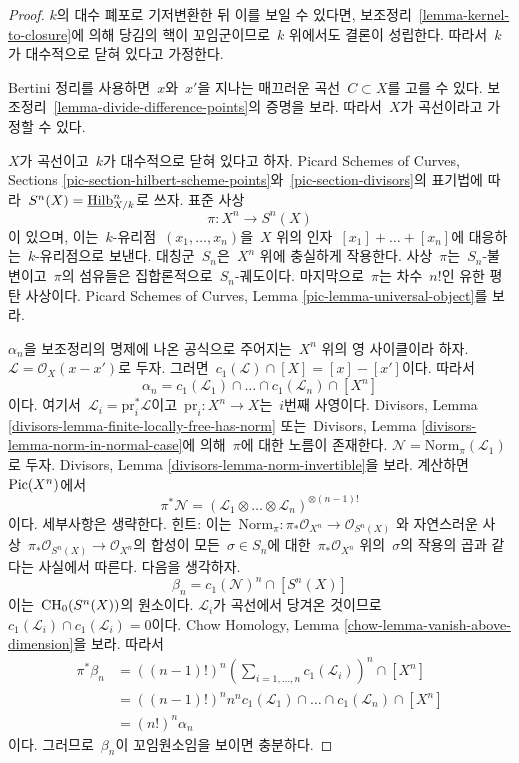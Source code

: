 \begin{proof}
$k$의 대수 폐포로 기저변환한 뒤 이를 보일 수 있다면, 보조정리\ 
\ref{lemma-kernel-to-closure}에 의해 당김의 핵이 꼬임군이므로\ 
$k$ 위에서도 결론이 성립한다. 따라서\  $k$가 대수적으로 닫혀 있다고
가정한다.

\medskip\noindent
Bertini 정리를 사용하면\  $x$와\  $x'$을 지나는 매끄러운 곡선\ 
$C \subset X$를 고를 수 있다. 보조정리\ 
\ref{lemma-divide-difference-points}의 증명을 보라. 따라서\  $X$가
곡선이라고 가정할 수 있다.

\medskip\noindent
$X$가 곡선이고\  $k$가 대수적으로 닫혀 있다고 하자. Picard Schemes of
Curves, Sections \ref{pic-section-hilbert-scheme-points}와\ 
\ref{pic-section-divisors}의 표기법에 따라\ 
$S^n(X) = \underline{\mathrm{Hilb}}^n_{X/k}$로 쓰자. 표준 사상
$$
\pi : X^n \longrightarrow S^n(X)
$$
이 있으며, 이는\  $k$-유리점\  $(x_1, \ldots, x_n)$을\  $X$ 위의 인자\ 
$[x_1] + \ldots + [x_n]$에 대응하는\  $k$-유리점으로 보낸다.
대칭군\  $S_n$은\  $X^n$ 위에 충실하게 작용한다. 사상\  $\pi$는\ 
$S_n$-불변이고\  $\pi$의 섬유들은 집합론적으로\  $S_n$-궤도이다.
마지막으로\  $\pi$는 차수\  $n!$인 유한 평탄 사상이다. Picard Schemes of
Curves, Lemma \ref{pic-lemma-universal-object}를 보라.

\medskip\noindent
$\alpha_n$을 보조정리의 명제에 나온 공식으로 주어지는\  $X^n$ 위의
영 사이클이라 하자. $\mathcal{L} = \mathcal{O}_X(x - x')$로 두자.
그러면\  $c_1(\mathcal{L}) \cap [X] = [x] - [x']$이다. 따라서
$$
\alpha_n = c_1(\mathcal{L}_1) \cap \ldots \cap c_1(\mathcal{L}_n) \cap [X^n]
$$
이다. 여기서\  $\mathcal{L}_i = \text{pr}_i^*\mathcal{L}$이고\ 
$\text{pr}_i : X^n \to X$는\  $i$번째 사영이다. Divisors, Lemma
\ref{divisors-lemma-finite-locally-free-has-norm} 또는\  Divisors, Lemma
\ref{divisors-lemma-norm-in-normal-case}에 의해\  $\pi$에 대한 노름이
존재한다. $\mathcal{N} = \text{Norm}_\pi(\mathcal{L}_1)$로 두자.
Divisors, Lemma \ref{divisors-lemma-norm-invertible}을 보라. 계산하면\ 
$\mathop{\mathrm{Pic}}\nolimits(X^n)$에서
$$
\pi^*\mathcal{N} =
(\mathcal{L}_1 \otimes \ldots \otimes \mathcal{L}_n)^{\otimes (n - 1)!}
$$
이다. 세부사항은 생략한다. 힌트: 이는\ 
$\text{Norm}_\pi : \pi_*\mathcal{O}_{X^n} \to \mathcal{O}_{S^n(X)}$
와 자연스러운 사상\  $\pi_*\mathcal{O}_{S^n(X)} \to \mathcal{O}_{X^n}$의
합성이 모든\  $\sigma \in S_n$에 대한\  $\pi_*\mathcal{O}_{X^n}$ 위의\ 
$\sigma$의 작용의 곱과 같다는 사실에서 따른다. 다음을 생각하자.
$$
\beta_n = c_1(\mathcal{N})^n \cap [S^n(X)]
$$
이는\  $\mathop{\mathrm{CH}}\nolimits_0(S^n(X))$의 원소이다. $\mathcal{L}_i$가 곡선에서
당겨온 것이므로\  $c_1(\mathcal{L}_i) \cap c_1(\mathcal{L}_i) = 0$이다.
Chow Homology, Lemma \ref{chow-lemma-vanish-above-dimension}을 보라.
따라서
\begin{align*}
\pi^*\beta_n
& =
((n - 1)!)^n
(\sum\nolimits_{i = 1, \ldots, n} c_1(\mathcal{L}_i))^n \cap [X^n] \\
& =
((n - 1)!)^n n^n 
c_1(\mathcal{L}_1) \cap \ldots \cap c_1(\mathcal{L}_n) \cap [X^n] \\
& =
(n!)^n \alpha_n
\end{align*}
이다. 그러므로\  $\beta_n$이 꼬임원소임을 보이면 충분하다.


\end{proof}
